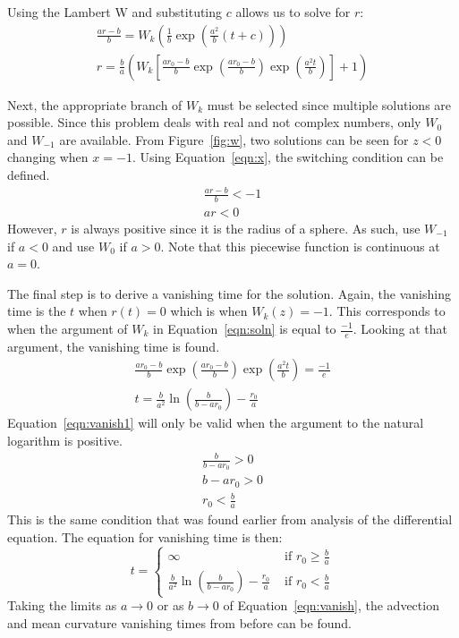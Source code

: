 \documentclass[journal]{IEEEtran}
\begin{document}
Using the Lambert W and substituting $c$ allows us to solve for $r$:
\begin{eqnarray}
  \frac{ar-b}{b} = W_k\left(\frac{1}{b}\exp\left(\frac{a^2}{b}(t+c)\right)\right) \\
  \label{eqn:soln}
  r = \frac{b}{a}\left(W_k\left[\frac{ar_0-b}{b} \exp\left(\frac{ar_0-b}{b}\right)\exp\left(\frac{a^2t}{b}\right)\right] + 1\right)
\end{eqnarray}

Next, the appropriate branch of $W_k$ must be selected since multiple solutions are possible.
Since this problem deals with real and not complex numbers, only $W_0$ and $W_{-1}$ are available.
From Figure~\ref{fig:w}, two solutions can be seen for $z < 0$ changing when $x = -1$.
Using Equation~\ref{eqn:x}, the switching condition can be defined.
\begin{eqnarray}
  \frac{ar-b}{b} < -1 \\
  ar < 0
\end{eqnarray}
However, $r$ is always positive since it is the radius of a sphere.
As such, use $W_{-1}$ if $a<0$ and use $W_0$ if $a>0$.
Note that this piecewise function is continuous at $a=0$.

The final step is to derive a vanishing time for the solution.
Again, the vanishing time is the $t$ when $r(t)=0$ which is when $W_k(z) = -1$.
This corresponds to when the argument of $W_k$ in Equation~\ref{eqn:soln} is equal to $\frac{-1}{e}$.
Looking at that argument, the vanishing time is found.
\begin{eqnarray}
  \frac{ar_0-b}{b} \exp\left(\frac{ar_0-b}{b}\right)\exp\left(\frac{a^2t}{b}\right) = \frac{-1}{e} \\
  \label{eqn:vanish1}
  t = \frac{b}{a^2} \ln\left(\frac{b}{b-ar_0}\right) - \frac{r_0}{a}
\end{eqnarray}
Equation~\ref{eqn:vanish1} will only be valid when the argument to the natural logarithm is positive.
\begin{eqnarray}
  \frac{b}{b-ar_0} > 0 \\
  b - ar_0 > 0 \\
  r_0 < \frac{b}{a}
\end{eqnarray}
This is the same condition that was found earlier from analysis of the differential equation.
The equation for vanishing time is then:
\begin{equation}
  \label{eqn:vanish}
  t = \left\{
    \begin{matrix}
      \infty & \text{ if } r_0 \geq \frac{b}{a} \\
      \frac{b}{a^2} \ln\left(\frac{b}{b-ar_0}\right) - \frac{r_0}{a} & \text{ if } r_0 < \frac{b}{a}
    \end{matrix}
  \right.
\end{equation}
Taking the limits as $a \rightarrow 0$ or as $b \rightarrow 0$ of Equation~\ref{eqn:vanish}, the advection and mean curvature vanishing times from before can be found.
\end{document}
